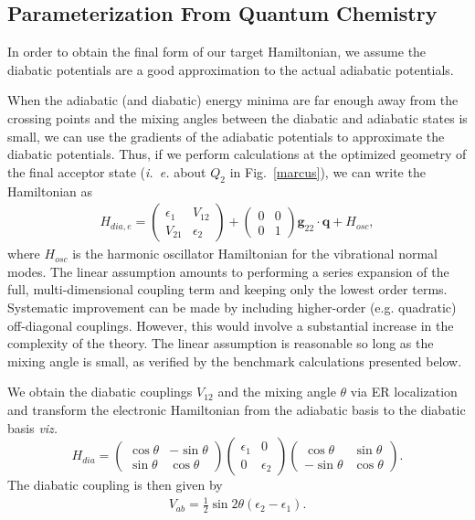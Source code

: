 \subsection{Parameterization From Quantum Chemistry}

 In order to obtain the final form of our target Hamiltonian, we assume the diabatic  potentials
are a good approximation to the actual adiabatic potentials.

When the adiabatic (and diabatic) energy minima
are far enough away from the crossing points and the mixing angles between the diabatic  and adiabatic
states is small, we can
use the gradients of the adiabatic potentials to approximate the diabatic potentials.
Thus, if we perform calculations at the
optimized geometry of the final acceptor state  ({\em i.~e.} about $Q_{2}$  in Fig.~\ref{marcus}),
we can write the Hamiltonian as
\begin{eqnarray}
H_{dia,e}=\left(\begin{array}{cc}
\epsilon_{1} & V_{12}\\
V_{21} & \epsilon_{2}
\end{array}\right)+\left(\begin{array}{cc}
0 & 0\\
0 & 1
\end{array}\right) {\mathbf g}_{22}\cdot{\mathbf q}+H_{osc},
\end{eqnarray}
where $H_{osc}$ is the harmonic oscillator Hamiltonian for the vibrational normal modes.
The linear assumption amounts  to performing a series expansion of the
full, multi-dimensional coupling term and keeping only the lowest order terms.
Systematic improvement can be made by including higher-order (e.g.  quadratic) off-diagonal couplings.
However, this would involve a substantial increase in the complexity of the theory.
The linear assumption is reasonable so long as  the mixing angle is small,
as verified by the benchmark calculations presented below.

We obtain the diabatic couplings $V_{12}$
and the mixing angle $\theta$  via ER localization and transform the electronic Hamiltonian
from the adiabatic basis to the diabatic basis {\em viz.}
\begin{equation}
H_{dia}=\left(\begin{array}{cc}
\cos\theta & -\sin\theta\\
\sin\theta & \cos\theta
\end{array}\right)\left(\begin{array}{cc}
\epsilon_{1}  & 0 \\
0  & \epsilon_{2}
\end{array}\right)\left(\begin{array}{cc}
\cos\theta & \sin\theta\\
-\sin\theta & \cos\theta
\end{array}\right).\label{eq:boys}
\end{equation}
The diabatic coupling is then given by
\begin{eqnarray}
V_{ab}=\frac{1}{2}\sin2\theta\left(\epsilon_{2}-\epsilon_{1}\right).\label{mixingangle}
\end{eqnarray}


